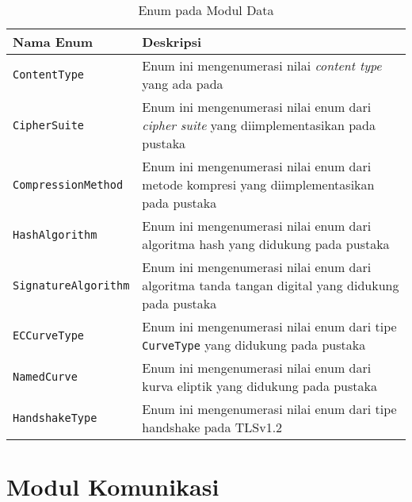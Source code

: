\begin{table}[!h]
  \centering
  \caption{Enum pada Modul Data} \label{tab:impl.enum}
  \begin{tabular}{|p{3.75cm}|p{9cm}|}
    \hline
    Nama Enum & Deskripsi \\ \hline
    \texttt{ContentType} & Enum ini mengenumerasi nilai \emph{content type} yang ada pada \textcite{rfc5246} \\ \hline
    \texttt{CipherSuite} & Enum ini mengenumerasi nilai enum dari \emph{cipher suite} yang diimplementasikan pada pustaka \\ \hline
    \texttt{CompressionMethod} & Enum ini mengenumerasi nilai enum dari metode kompresi yang diimplementasikan pada pustaka \\ \hline
    \texttt{HashAlgorithm} & Enum ini mengenumerasi nilai enum dari algoritma hash yang didukung pada pustaka \\ \hline
    \texttt{SignatureAlgorithm} & Enum ini mengenumerasi nilai enum dari algoritma tanda tangan digital yang didukung pada pustaka \\ \hline
    \texttt{ECCurveType} & Enum ini mengenumerasi nilai enum dari tipe \texttt{CurveType} yang didukung pada pustaka\\ \hline
    \texttt{NamedCurve} & Enum ini mengenumerasi nilai enum dari kurva eliptik yang didukung pada pustaka\\ \hline
    \texttt{HandshakeType} & Enum ini mengenumerasi nilai enum dari tipe handshake pada TLSv1.2\\ \hline
  \end{tabular}
\end{table}

\section{Modul Komunikasi}


